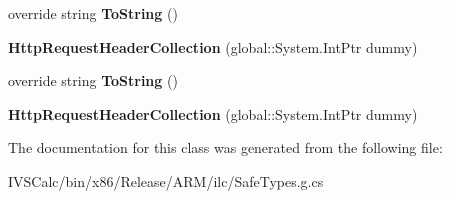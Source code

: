\begin{DoxyCompactItemize}
override string {\bfseries To\+String} ()
\item 
\mbox{\label{class_windows_1_1_web_1_1_http_1_1_headers_1_1_http_request_header_collection_a669a840642cf2384b6c1729ab3e88e8f}} 
{\bfseries Http\+Request\+Header\+Collection} (global\+::\+System.\+Int\+Ptr dummy)
\item 
\mbox{\label{class_windows_1_1_web_1_1_http_1_1_headers_1_1_http_request_header_collection_a9d307f3cf47ead1ca657f17e04f63f6e}} 
override string {\bfseries To\+String} ()
\item 
\mbox{\label{class_windows_1_1_web_1_1_http_1_1_headers_1_1_http_request_header_collection_a669a840642cf2384b6c1729ab3e88e8f}} 
{\bfseries Http\+Request\+Header\+Collection} (global\+::\+System.\+Int\+Ptr dummy)
\end{DoxyCompactItemize}


The documentation for this class was generated from the following file\+:\begin{DoxyCompactItemize}
\item 
I\+V\+S\+Calc/bin/x86/\+Release/\+A\+R\+M/ilc/Safe\+Types.\+g.\+cs\end{DoxyCompactItemize}
